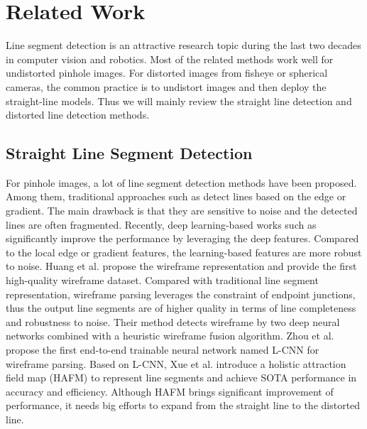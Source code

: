 \documentclass[letterpaper, 10 pt, conference]{ieeeconf}
\begin{document}
\section{Related Work} \label{sec2}
Line segment detection is an attractive research topic during the last two decades in computer vision and robotics. Most of the related methods work well for undistorted pinhole images. For distorted images from fisheye or spherical cameras, the common practice is to undistort images and then deploy the straight-line models. Thus we will mainly review the straight line detection and distorted line detection methods.   

\subsection{Straight Line Segment Detection} \label{sec2-1}
For pinhole images, a lot of line segment detection methods have been proposed. Among them, traditional approaches such as \cite{HT,PHT,LSD} detect lines based on the edge or gradient. The main drawback is that they are sensitive to noise and the detected lines are often fragmented. Recently, deep learning-based works such as \cite{AFM, PPGnet} significantly improve the performance by leveraging the deep features. Compared to the local edge or gradient features, the learning-based features are more robust to noise. Huang et al. \cite{DWP} propose the wireframe representation and provide the first high-quality wireframe dataset. Compared with traditional line segment representation, wireframe parsing leverages the constraint of endpoint junctions, thus the output line segments are of higher quality in terms of line completeness and robustness to noise. Their method detects wireframe by two deep neural networks combined with a heuristic wireframe fusion algorithm. Zhou et al. propose the first end-to-end trainable neural network named L-CNN \cite{LCNN} for wireframe parsing. Based on L-CNN, Xue et al. introduce a holistic attraction field map (HAFM) \cite{HAWP} to represent line segments and achieve SOTA performance in accuracy and efficiency. Although HAFM brings significant improvement of performance, it needs big efforts to expand from the straight line to the distorted line.
\end{document}
